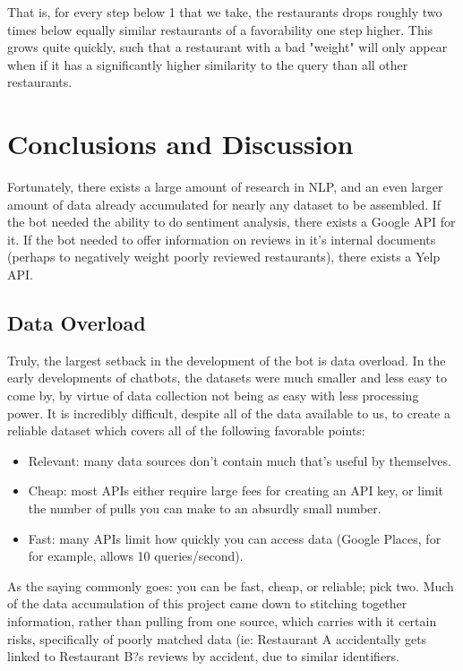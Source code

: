 \documentclass{article}
\begin{document}
        That is, for every step below 1 that we take, the restaurants drops roughly two times below equally similar restaurants of a favorability one step 
higher. This grows quite quickly, such that a restaurant with a bad "weight" will only appear when if it has a significantly higher similarity to the query than 
all other restaurants.
    
\section{Conclusions and Discussion}
    Fortunately, there exists a large amount of research in NLP, and an even larger amount of data already accumulated for nearly any dataset to be assembled. 
If the bot needed the ability to do sentiment analysis, there exists a Google API for it. If the bot needed to offer information on reviews in it's internal 
documents (perhaps to negatively weight poorly reviewed restaurants), there exists a Yelp API.

    \subsection{Data Overload}
    Truly, the largest setback in the development of the bot is data overload. In the early developments of chatbots, the datasets were much smaller and less 
easy to come by, by virtue of data collection not being as easy with less processing power. It is incredibly difficult, despite all of the data available to us, 
to create a reliable dataset which covers all of the following favorable points:
    
    \begin{itemize}
        \item Relevant: many data sources don't contain much that's useful by themselves.
        \item Cheap: most APIs either require large fees for creating an API key, or limit the number of pulls you can make to an absurdly small number.
         \item Fast: many APIs limit how quickly you can access data (Google Places, for for example, allows 10 queries/second).
    \end{itemize}
    
    As the saying commonly goes: you can be fast, cheap, or reliable; pick two. Much of the data accumulation of this project came down to stitching together 
information, rather than pulling from one source, which carries with it certain risks, specifically of poorly matched data (ie: Restaurant A accidentally gets 
linked to Restaurant B?s reviews by accident, due to similar identifiers.
    
\end{document}
